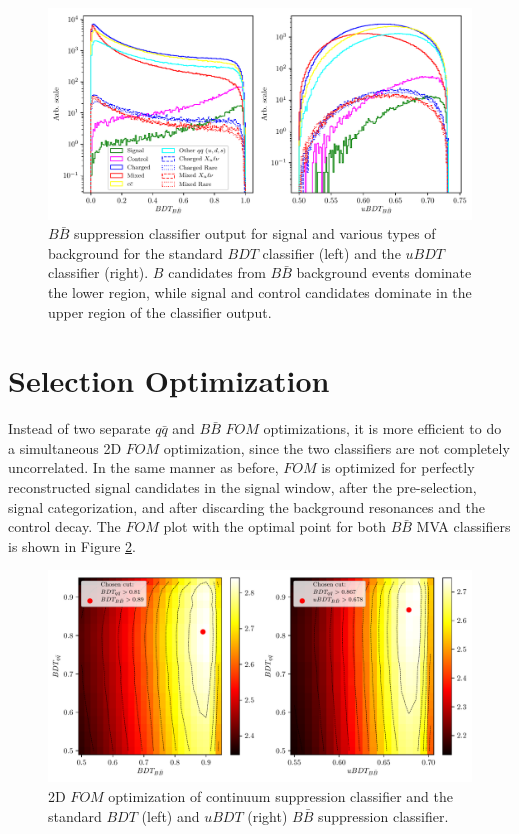 \begin{figure}[H]
	\centering
	\captionsetup{width=0.8\linewidth}
	\includegraphics[width=\linewidth]{fig/bb_BDT}
	\caption{$B\bar B$ suppression classifier output for signal and various types of background for the standard $BDT$ classifier (left) and the $uBDT$ classifier (right). $B$ candidates from $B\bar B$ background events dominate the lower region, while signal and control candidates dominate in the upper region of the classifier output.}
	\label{fig:bbmva}
\end{figure}

\section{Selection Optimization}\label{sec:selection-optimization}

Instead of two separate $q \bar q$ and $B \bar B$ $FOM$ optimizations, it is more efficient to do a simultaneous 2D $FOM$ optimization, since the two classifiers are not completely uncorrelated. In the same manner as before, $FOM$ is optimized for perfectly reconstructed signal candidates in the signal window, after the pre-selection, signal categorization, and after discarding the background resonances and the control decay. The $FOM$ plot with the optimal point for both $B \bar B$ MVA classifiers is shown in Figure \ref{fig:mvafom}.

\begin{figure}[H]
	\centering
	\captionsetup{width=0.8\linewidth}
	\includegraphics[width=\linewidth]{fig/mva_fom}
	\caption{2D $FOM$ optimization of continuum suppression classifier and the standard $BDT$ (left) and $uBDT$ (right) $B\bar B$ suppression classifier.}
	\label{fig:mvafom}
\end{figure}

